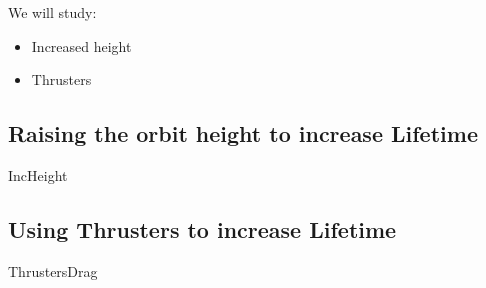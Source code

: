 
We will study:

\begin{itemize}
\item Increased height
\item Thrusters
\end{itemize}

\subsection{Raising the orbit height to increase Lifetime}
{IncHeight}

\subsection{Using Thrusters to increase Lifetime}
{ThrustersDrag}
